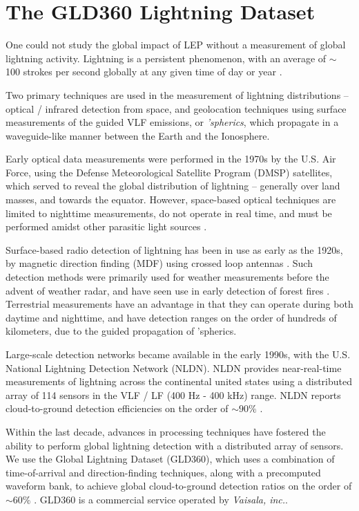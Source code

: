 \section{The GLD360 Lightning Dataset}
One could not study the global impact of LEP without a measurement of global lightning activity. Lightning is a persistent phenomenon, with an average of $\sim$ 100 strokes per second globally at any given time of day or year \citep{Brooks1925, Orville1979}.

Two primary techniques are used in the measurement of lightning distributions -- optical / infrared detection from space, and geolocation techniques using surface measurements of the guided VLF emissions, or \emph{'spherics}, which propagate in a waveguide-like manner between the Earth and the Ionosphere. 

Early optical data measurements were performed in the 1970s by the U.S. Air Force, using the Defense Meteorological Satellite Program (DMSP) satellites, which served to reveal the global distribution of lightning -- generally over land masses, and towards the equator. However, space-based optical techniques are limited to nighttime measurements, do not operate in real time, and must be performed amidst other parasitic light sources \citep{Orville1995}.

Surface-based radio detection of lightning has been in use as early as the 1920s, by magnetic direction finding (MDF) using crossed loop antennas \citep{Horner1954, Horner1957}. Such detection methods were primarily used for weather measurements before the advent of weather radar, and have seen use in early detection of forest fires \citep{Krider1980}. Terrestrial measurements have an advantage in that they can operate during both daytime and nighttime, and have detection ranges on the order of hundreds of kilometers, due to the guided propagation of 'spherics.

Large-scale detection networks became available in the early 1990s, with the U.S. National Lightning Detection Network (NLDN). NLDN provides near-real-time measurements of lightning across the continental united states using a distributed array of 114 sensors in the VLF / LF (400 Hz - 400 kHz) range. NLDN reports cloud-to-ground detection efficiencies on the order of $\sim90\%$ \citep{Nag2011}. 

Within the last decade, advances in processing techniques have fostered the ability to perform global lightning detection with a distributed array of sensors. We use the Global Lightning Dataset (GLD360), which uses a combination of time-of-arrival and direction-finding techniques, along with a precomputed waveform bank, to achieve global cloud-to-ground detection ratios on the order of $\sim{60\%}$ \citep{Said2010a}. GLD360 is a commercial service operated by \emph{Vaisala, inc.}.

